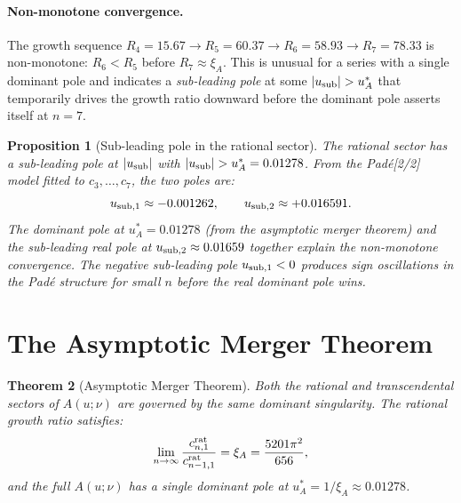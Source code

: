 \documentclass[11pt,a4paper]{article}
\theoremstyle{plain}
\newtheorem{theorem}{Theorem}[section]
\newtheorem{proposition}[theorem]{Proposition}
\theoremstyle{definition}
\theoremstyle{remark}
\newcommand{\uA}{u_A^*}
\newcommand{\xiA}{\xi_A}
\begin{document}
\paragraph{Non-monotone convergence.}
The growth sequence $R_4 = 15.67 \to R_5 = 60.37 \to R_6 = 58.93 \to R_7 = 78.33$
is non-monotone: $R_6 < R_5$ before $R_7 \approx \xiA$.  This is unusual for a
series with a single dominant pole and indicates a \emph{sub-leading pole} at
some $|u_{\rm sub}| > \uA$ that temporarily drives the growth ratio downward before
the dominant pole asserts itself at $n=7$.

\begin{proposition}[Sub-leading pole in the rational sector]
\label{prop:sublead}
The rational sector has a sub-leading pole at $|u_{\rm sub}|$ with
$|u_{\rm sub}| > \uA = 0.01278$.  From the Pad\'e[2/2] model fitted to
$c_3,\ldots,c_7$, the two poles are:
\begin{equation}
  u_{\rm sub,1} \approx -0.001262,\qquad u_{\rm sub,2} \approx +0.016591.
  \label{eq:sublead_poles}
\end{equation}
The dominant pole at $\uA = 0.01278$ (from the asymptotic merger theorem) and the
sub-leading real pole at $u_{\rm sub,2} \approx 0.01659$ together explain the
non-monotone convergence.  The negative sub-leading pole $u_{\rm sub,1} < 0$
produces sign oscillations in the Pad\'e structure for small $n$ before the real
dominant pole wins.
\end{proposition}

\section{The Asymptotic Merger Theorem}
\label{sec:merger}

\begin{theorem}[Asymptotic Merger Theorem]\label{thm:merger}
Both the rational and transcendental sectors of $A(u;\nu)$ are governed by the
same dominant singularity.  The rational growth ratio satisfies:
\begin{equation}
  \lim_{n\to\infty}\frac{c_{n,1}^{\rm rat}}{c_{n-1,1}^{\rm rat}} = \xiA = \frac{5201\pi^2}{656},
  \label{eq:merger}
\end{equation}
and the full $A(u;\nu)$ has a \emph{single dominant pole} at $\uA = 1/\xiA \approx 0.01278$.
\end{theorem}
\end{document}
